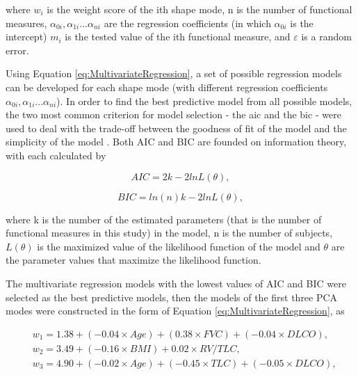 \noindent where $w_i$ is the weight score of the ith shape mode, n is the number of functional measures, $\alpha_{0i}, \alpha_{1i} ... \alpha_{ni}$ are the regression coefficients (in which $\alpha_{0i}$ is the intercept) $m_i$ is the tested value of the ith functional measure, and $\varepsilon$ is a random error. 

Using Equation \ref{eq:MultivariateRegression}, a set of possible regression models can be developed for each shape mode (with different regression coefficients $\alpha_{0i}, \alpha_{1i} ... \alpha_{ni}$). In order to find the best predictive model from all possible models, the two most common criterion for model selection - the \gls{aic} and the \gls{bic} - were used to deal with the trade-off between the goodness of fit of the model and the simplicity of the model \citep{aho2014model}. Both AIC and BIC are founded on information theory, with each calculated by

\begin{equation}
 \label{eq:AIC}
 AIC = 2k - 2lnL(\theta),
\end{equation}

\begin{equation}
 \label{eq:BIC}
 BIC = ln(n)k - 2lnL(\theta),
\end{equation}

\noindent where k is the number of the estimated parameters (that is the number of functional measures in this study) in the model, n is the number of subjects, $L(\theta)$ is the maximized value of the likelihood function of the model and $\theta$ are the parameter values that maximize the likelihood function.

The multivariate regression models with the lowest values of AIC and BIC were selected as the best predictive models, then the models of the first three PCA modes were constructed in the form of Equation \ref{eq:MultivariateRegression}, as

\begin{equation} 
 \label{eq:TerminalBoundaryCondition}
 \begin{split}
 & w_1 = 1.38 + (-0.04 \times Age) + (0.38 \times FVC) + (-0.04 \times DLCO), \\
 & w_2 = 3.49 + (-0.16 \times BMI) + 0.02 \times RV/TLC, \\
 & w_3 = 4.90 + (-0.02 \times Age) + (-0.45 \times TLC) + (-0.05 \times DLCO), \\
 \end{split}
\end{equation}
 
